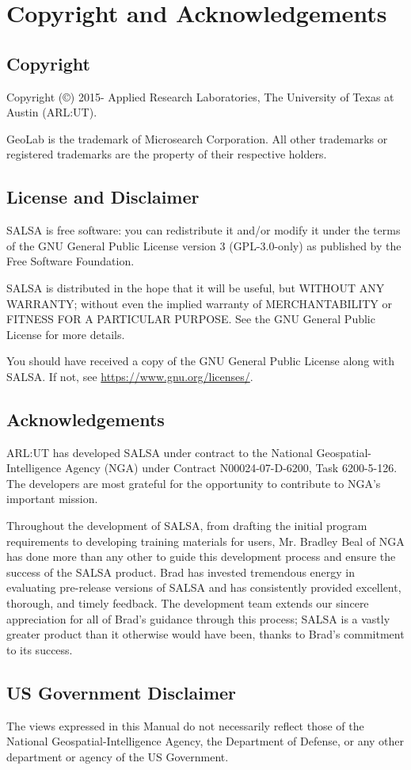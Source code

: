 \chapter*{Copyright and Acknowledgements}
\label{chap:copyright}


\section*{Copyright}
Copyright (\copyright) 2015-\the\year{} Applied Research Laboratories, The University of Texas at Austin (ARL:UT).

GeoLab is the trademark of Microsearch Corporation.  All other trademarks or registered trademarks are the property of their respective holders.


\section*{License and Disclaimer}
SALSA is free software: you can redistribute it and/or modify it under the terms of the GNU General Public License version 3 (GPL-3.0-only) as published by the Free Software Foundation.

SALSA is distributed in the hope that it will be useful, but WITHOUT ANY WARRANTY; without even the implied warranty of MERCHANTABILITY or FITNESS FOR A PARTICULAR PURPOSE.  See the GNU General Public License for more details.

You should have received a copy of the GNU General Public License along with SALSA.  If not, see \url{https://www.gnu.org/licenses/}.


\newpage
\section*{Acknowledgements}
ARL:UT has developed SALSA under contract to the National Geospatial-Intelligence Agency (NGA) under Contract N00024-07-D-6200, Task 6200-5-126.  The developers are most grateful for the opportunity to contribute to NGA's important mission.

Throughout the development of SALSA, from drafting the initial program requirements to developing training materials for users, Mr. Bradley Beal of NGA has done more than any other to guide this development process and ensure the success of the SALSA product.  Brad has invested tremendous energy in evaluating pre-release versions of SALSA and has consistently provided excellent, thorough, and timely feedback.  The development team extends our sincere appreciation for all of Brad's guidance through this process; SALSA is a vastly greater product than it otherwise would have been, thanks to Brad's commitment to its success.

\section*{US Government Disclaimer}
The views expressed in this Manual do not necessarily reflect those of the National Geospatial-Intelligence Agency, the Department of Defense, or any other department or agency of the US Government.
